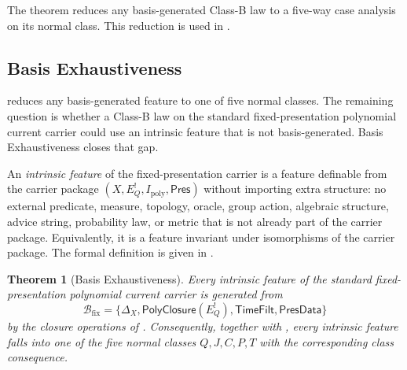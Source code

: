 \documentclass[11pt]{article}
\newcommand{\Ipoly}{I_{\mathrm{poly}}}
\newcommand{\EQbang}{E^{!}_{Q}}
\newtheorem{theorem}{Theorem}[section]
\theoremstyle{definition}
\begin{document}
The theorem reduces any basis-generated Class-B law to a five-way case
analysis on its normal class.  This reduction is used in
.

\subsection{Basis Exhaustiveness}
\label{subsec:class-b:basis-exhaustiveness}

 reduces any
basis-generated feature to one of five normal classes.  The remaining
question is whether a Class-B law on the standard fixed-presentation
polynomial current carrier could use an intrinsic feature that is not
basis-generated.  Basis Exhaustiveness closes that gap.

An \emph{intrinsic feature} of the fixed-presentation carrier is a
feature definable from the carrier package
\((X,\EQbang,\Ipoly,\mathsf{Pres})\) without importing extra structure:
no external predicate, measure, topology, oracle, group action,
algebraic structure, advice string, probability law, or metric that is
not already part of the carrier package.  Equivalently, it is a feature
invariant under isomorphisms of the carrier package.  The formal
definition is given in .

\begin{theorem}[Basis Exhaustiveness]
\label{thm:pvnp:basis-exhaustiveness}
Every intrinsic feature of the standard fixed-presentation polynomial
current carrier is generated from
\[
  \mathcal B_{\mathrm{fix}}
  =
  \{\Delta_X,\mathsf{PolyClosure}(\EQbang),
    \mathsf{TimeFilt},\mathsf{PresData}\}
\]
by the closure operations of .
Consequently, together with
, every intrinsic feature
falls into one of the five normal classes \(Q,J,C,P,T\) with the
corresponding class consequence.
\end{theorem}
\end{document}
